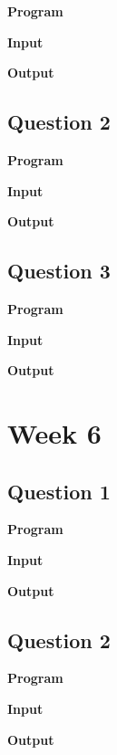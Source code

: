 \documentclass{article}
\begin{document}
\noindent \textbf{\large{Program}}

\newpage
\noindent \textbf{\large{Input}}

\noindent \textbf{\large{Output}}


\newpage
\subsection{Question 2}

\newline 

\noindent \textbf{\large{Program}}

\newpage
\noindent \textbf{\large{Input}}

\noindent \textbf{\large{Output}}


\newpage
\subsection{Question 3}

\newline 

\noindent \textbf{\large{Program}}

\newpage
\noindent \textbf{\large{Input}}

\noindent \textbf{\large{Output}}

\newpage
\section{Week 6}

\subsection{Question 1}

\newline 

\noindent \textbf{\large{Program}}

\newpage
\noindent \textbf{\large{Input}}

\noindent \textbf{\large{Output}}


\newpage
\subsection{Question 2}

\newline 

\noindent \textbf{\large{Program}}

\newpage
\noindent \textbf{\large{Input}}

\noindent \textbf{\large{Output}}

\end{document}
